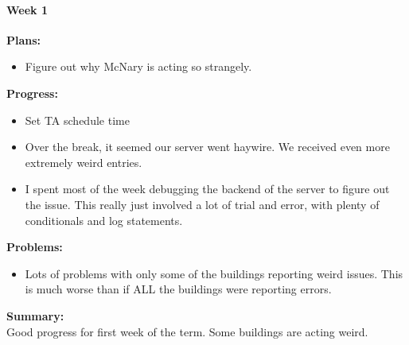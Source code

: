 \paragraph{Week 1}
\begin{adjustwidth}{2.5em}{0pt}
    \vspace{-0.5cm}\textbf{Plans:}
    \vspace{-0.5cm}
    \begin{itemize}
        \item Figure out why McNary is acting so strangely.
    \end{itemize} 
    \vspace{-0.3cm}\textbf{Progress:}
    \vspace{-0.5cm}
    \begin{itemize}
        \item Set TA schedule time
        \item Over the break, it seemed our server went haywire. We received even more extremely weird entries. 
		\item I spent most of the week debugging the backend of the server to figure out the issue. This really just involved a lot of trial and error, with plenty of conditionals and log statements.
    \end{itemize} 
    \vspace{-0.3cm}\textbf{Problems:}
    \vspace{-0.5cm}
    \begin{itemize}
        \item Lots of problems with only some of the buildings reporting weird issues. This is much worse than if ALL the buildings were reporting errors.
    \end{itemize}  
    \vspace{-0.3cm}\noindent\textbf{Summary:}\\
    \noindent Good progress for first week of the term. Some buildings are acting weird. 
\end{adjustwidth}
